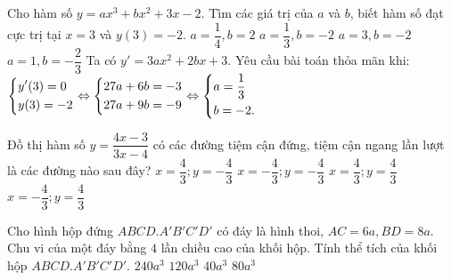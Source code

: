 \begin{ex}%
Cho hàm số $y = ax^3+bx^2+3x-2$. Tìm các giá trị của $a$ và $b$, biết hàm số đạt cực trị tại $x = 3$ và $y(3) = -2$.
 \choice
  { $a = \dfrac{1}{4}, b = 2$}
  { \True $a = \dfrac{1}{3}, b = -2$}
  { $a = 3, b = -2$}
  { $a = 1, b = -\dfrac{2}{3}$}
 \loigiai
  {
  Ta có $y' = 3ax^2 +2bx + 3$. Yêu cầu bài toán thỏa mãn khi:\\
  $\left\{\begin{aligned}& y'(3) = 0 \\& y(3) = -2\end{aligned}\right. \Leftrightarrow \left\{\begin{aligned}&27a + 6b = -3 \\& 27a + 9b = -9\end{aligned}\right. \Leftrightarrow \left\{\begin{aligned}& a = \dfrac{1}{3} \\& b = -2.\end{aligned}\right.$
  }
\end{ex}


\begin{ex}%
Đồ thị hàm số $y = \dfrac{4x-3}{3x-4}$ có các đường tiệm cận đứng, tiệm cận ngang lần lượt là các đường nào sau đây?
 \choice
  { $x = \dfrac{4}{3}; y = -\dfrac{4}{3}$}
  { $x = -\dfrac{4}{3}; y = -\dfrac{4}{3}$}
  { \True $x = \dfrac{4}{3}; y = \dfrac{4}{3}$}
  { $x = -\dfrac{4}{3}; y = \dfrac{4}{3}$}
  {
  
  }
\end{ex}


\begin{ex}%
Cho hình hộp đứng $ABCD.A'B'C'D'$ có đáy là hình thoi, $AC = 6a, BD = 8a$. Chu vi của một đáy bằng $4$ lần chiều cao của khối hộp. Tính thể tích của khối hộp $ABCD.A'B'C'D'$.
 \choice
  { $240 a^3$}
  { \True $120 a^3$}
  { $40 a^3$}
  { $80 a^3$}
 \loigiai
  {
  {
  }
  }
\end{ex}


